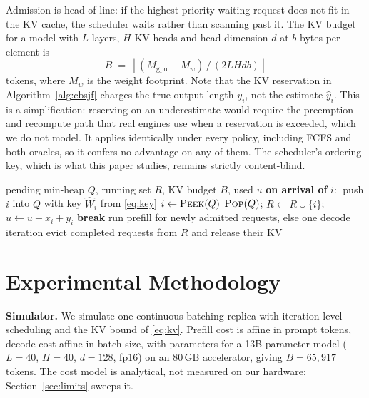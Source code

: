 \documentclass[conference,10pt,letterpaper]{IEEEtran}
\begin{document}
Admission is head-of-line: if the highest-priority waiting request does not fit
in the KV cache, the scheduler waits rather than scanning past it. The KV budget
for a model with $L$ layers, $H$ KV heads and head dimension $d$ at $b$ bytes
per element is
\begin{equation}
  \label{eq:kv}
  B \;=\; \left\lfloor (M_{\mathrm{gpu}} - M_{w}) \,/\, (2 L H d b) \right\rfloor
\end{equation}
tokens, where $M_w$ is the weight footprint. Note that the KV reservation in
Algorithm~\ref{alg:cbsjf} charges the true output length $y_i$, not the estimate
$\hat{y}_i$. This is a simplification: reserving on an underestimate would
require the preemption and recompute path that real engines use when a
reservation is exceeded, which we do not model. It applies identically under
every policy, including FCFS and both oracles, so it confers no advantage on any
of them. The scheduler's ordering key, which is what this paper studies, remains
strictly content-blind.

\begin{algorithm}[!t]
  \caption{CB-SJF-Work admission (one scheduling iteration)}
  \label{alg:cbsjf}
  \begin{algorithmic}[1]
    \Require pending min-heap $Q$, running set $R$, KV budget $B$, used $u$
    \State \textbf{on arrival of} $i$: $\;$push $i$ into $Q$ with key
           $\widehat{W}_i$ from \eqref{eq:key} 
      \State $i \gets \textsc{Peek}(Q)$
        \State $\textsc{Pop}(Q)$; $R \gets R \cup \{i\}$; $u \gets u + x_i + y_i$
      \Else
        \State \textbf{break} 
      \EndIf
    \EndWhile
    \State run prefill for newly admitted requests, else one decode iteration
    \State evict completed requests from $R$ and release their KV
  \end{algorithmic}
\end{algorithm}

\section{Experimental Methodology}
\label{sec:setup}

\textbf{Simulator.} We simulate one continuous-batching replica with
iteration-level scheduling and the KV bound of \eqref{eq:kv}. Prefill cost is
affine in prompt tokens, decode cost affine in batch size, with parameters for a
13B-parameter model ($L=40$, $H=40$, $d=128$, fp16) on an 80\,GB accelerator,
giving $B=65{,}917$ tokens. The cost model is analytical, not measured on our
hardware; Section~\ref{sec:limits} sweeps it.
\end{document}
